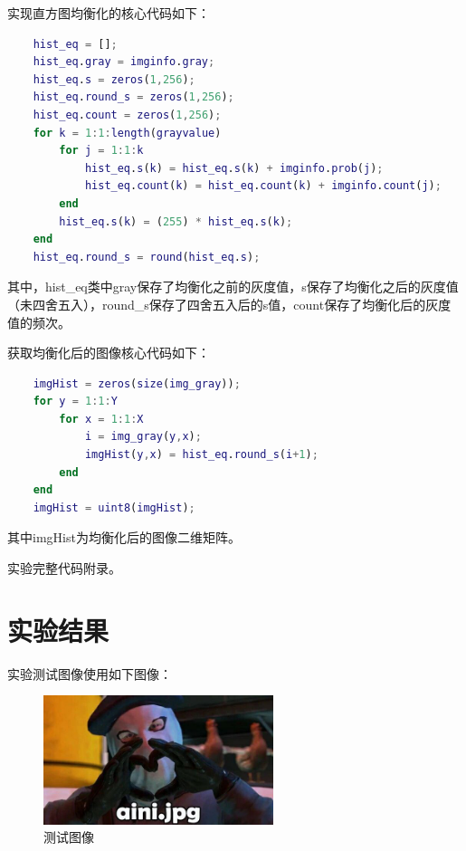 \documentclass{../source/Experiment}
\begin{document}
实现直方图均衡化的核心代码如下：
\begin{lstlisting}[language = matlab]
    % 获取量化后的灰度s，数量，概率
    hist_eq = [];
    hist_eq.gray = imginfo.gray;
    hist_eq.s = zeros(1,256);
    hist_eq.round_s = zeros(1,256);
    hist_eq.count = zeros(1,256);
    for k = 1:1:length(grayvalue)
        for j = 1:1:k
            hist_eq.s(k) = hist_eq.s(k) + imginfo.prob(j);
            hist_eq.count(k) = hist_eq.count(k) + imginfo.count(j);
        end
        hist_eq.s(k) = (255) * hist_eq.s(k);
    end
    hist_eq.round_s = round(hist_eq.s);
        \end{lstlisting}
其中，hist\_eq类中gray保存了均衡化之前的灰度值，s保存了均衡化之后的灰度值（未四舍五入），round\_s保存了四舍五入后的s值，count保存了均衡化后的灰度值的频次。

获取均衡化后的图像核心代码如下：
\begin{lstlisting}[language = matlab]
    % 获取均衡化后的图像
    imgHist = zeros(size(img_gray));
    for y = 1:1:Y
        for x = 1:1:X
            i = img_gray(y,x);
            imgHist(y,x) = hist_eq.round_s(i+1);
        end
    end
    imgHist = uint8(imgHist);
        \end{lstlisting}
其中imgHist为均衡化后的图像二维矩阵。

实验完整代码附录。
\section{实验结果}
实验测试图像使用如下图像：
\begin{figure}[H]
    \centering
    \includegraphics[width = 0.6\textwidth]{第一次/aini.jpg}
    \caption{测试图像}
\end{figure}
\end{document}
